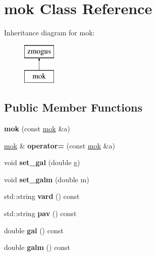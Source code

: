 \hypertarget{classmok}{}\section{mok Class Reference}
\label{classmok}
Inheritance diagram for mok\+:\begin{figure}[H]
\begin{center}
\leavevmode
\includegraphics[height=2.000000cm]{classmok}
\end{center}
\end{figure}
\subsection*{Public Member Functions}
\begin{DoxyCompactItemize}
\item 
\mbox{\label{classmok_a5347a962fb772f1db8389f05b066b55d}} 
{\bfseries mok} (const \mbox{\hyperlink{classmok}{mok}} \&a)
\item 
\mbox{\label{classmok_ac92e988719e9cbde3e765e63cc7a5b40}} 
\mbox{\hyperlink{classmok}{mok}} \& {\bfseries operator=} (const \mbox{\hyperlink{classmok}{mok}} \&a)
\item 
\mbox{\label{classmok_a8f3b27aefed4934abcb8e51d34e3a090}} 
void {\bfseries set\+\_\+gal} (double g)
\item 
\mbox{\label{classmok_a8d4d040db497a469692641e11515bd33}} 
void {\bfseries set\+\_\+galm} (double m)
\item 
\mbox{\label{classmok_af674b0f2dd9a398dad38345ab4b1b889}} 
std\+::string {\bfseries vard} () const
\item 
\mbox{\label{classmok_a9a79a2f9510e26af087180e7f46812f9}} 
std\+::string {\bfseries pav} () const
\item 
\mbox{\label{classmok_ab3da02838b3f85843f2455a42e74c22b}} 
double {\bfseries gal} () const
\item 
\mbox{\label{classmok_a8767ea2298cf58075ed873495049d2cd}} 
double {\bfseries galm} () const
\end{DoxyCompactItemize}
